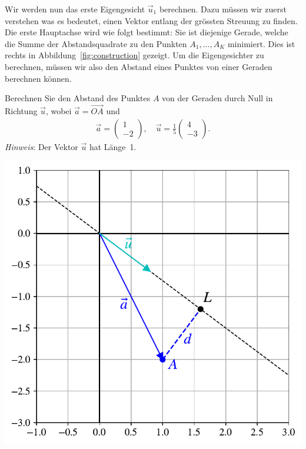 Wir werden nun das erste Eigengesicht $\vec{u}_1$ berechnen.
Dazu müssen wir zuerst verstehen was es bedeutet, einen Vektor \glqq{}entlang der grössten Streuung\grqq{} zu finden.
Die erste Hauptachse wird wie folgt bestimmt:
Sie ist diejenige Gerade, welche die Summe der Abstandsquadrate zu den Punkten $A_1,\ldots,A_K$ minimiert.
Dies ist rechts in Abbildung~\ref{fig:construction} gezeigt.
Um die Eigengesichter zu berechnen, müssen wir also den Abstand eines Punktes von einer Geraden berechnen können.
\begin{aufgabe} \label{aufg:distance_simple}
	\begin{minipage}{0.55\textwidth}
		Berechnen Sie den Abstand des Punktes $A$ von der Geraden durch Null in Richtung $\vec{u}$, wobei $\vec{a}=\overrightarrow{OA}$ und
		\begin{align*}
			\vec{a}=
			\begin{pmatrix}
				1 \\
				-2
			\end{pmatrix},\quad
			\vec{u}=\frac{1}{5}
			\begin{pmatrix}
				4 \\
				-3
			\end{pmatrix}.
		\end{align*}
		\textit{Hinweis}: Der Vektor $\vec{u}$ hat Länge~1.
	\end{minipage}\hfill
	\begin{minipage}{0.4\textwidth}
		\includegraphics[width=\textwidth]{images/facespace/distance_simple}
	\end{minipage}
\end{aufgabe}
